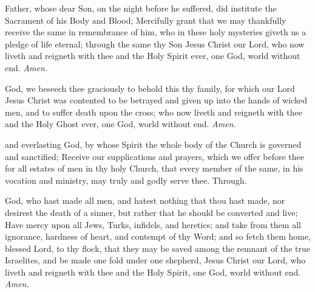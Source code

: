 \vspace{-0.1\baselineskip}

     Father, whose dear Son, on the night before he suffered, did institute the Sacrament of his Body and Blood; Mercifully grant that we may thankfully receive the same in remembrance of him, who in these holy mysteries giveth us a pledge of life eternal; through the same thy Son Jesus Christ our Lord, who now liveth and reigneth with thee and the Holy Spirit ever, one God, world without end. \textit{Amen.}
	
\vspace{-0.2\baselineskip}

    
\vspace{-0.1\baselineskip}

     God, we beseech thee graciously to behold this thy family, for which our Lord Jesus Christ was contented to be betrayed and given up into the hands of wicked men, and to suffer death upon the cross; who now liveth and reigneth with thee and the Holy Ghost ever, one God, world without end. \textit{Amen.}
    
     and everlasting God, by whose Spirit the whole body of the Church is governed and sanctified; Receive our supplications and prayers, which we offer before thee for all estates of men in thy holy Church, that every member of the same, in his vocation and ministry, may truly and godly serve thee. Through.
	
     God, who hast made all men, and hatest nothing that thou hast made, nor desirest the death of a sinner, but rather that he should be converted and live; Have mercy upon all Jews, Turks, infidels, and heretics; and take from them all ignorance, hardness of heart, and contempt of thy Word; and so fetch them home, blessed Lord, to thy flock, that they may be saved among the remnant of the true Israelites, and be made one fold under one shepherd, Jesus Christ our Lord, who liveth and reigneth with thee and the Holy Spirit, one God, world without end. \textit{Amen.}
	


